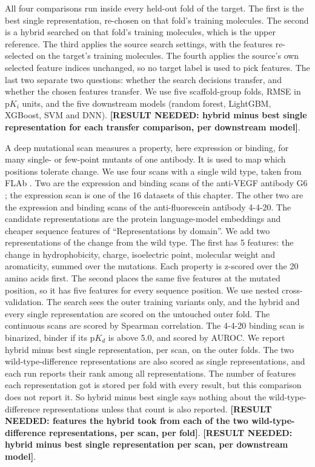 All four comparisons run inside every held-out fold of the target. The first is the best single representation, re-chosen on that fold's training molecules. The second is a hybrid searched on that fold's training molecules, which is the upper reference. The third applies the source search settings, with the features re-selected on the target's training molecules. The fourth applies the source's own selected feature indices unchanged, so no target label is used to pick features. The last two separate two questions: whether the search decisions transfer, and whether the chosen features transfer. We use five scaffold-group folds, RMSE in $\mathrm{p}K_i$ units, and the five downstream models (random forest, LightGBM, XGBoost, SVM and DNN). \textbf{[RESULT NEEDED: hybrid minus best single representation for each transfer comparison, per downstream model]}.

A deep mutational scan measures a property, here expression or binding, for many single- or few-point mutants of one antibody. It is used to map which positions tolerate change. We use four scans with a single wild type, taken from FLAb \citep{Chungyoun2024}. Two are the expression and binding scans of the anti-VEGF antibody G6 \citep{Koenig2017}; the expression scan is one of the 16 datasets of this chapter. The other two are the expression and binding scans of the anti-fluorescein antibody 4-4-20. The candidate representations are the protein language-model embeddings and cheaper sequence features of ``Representations by domain''. We add two representations of the change from the wild type. The first has 5 features: the change in hydrophobicity, charge, isoelectric point, molecular weight and aromaticity, summed over the mutations. Each property is z-scored over the 20 amino acids first. The second places the same five features at the mutated position, so it has five features for every sequence position. We use nested cross-validation. The search sees the outer training variants only, and the hybrid and every single representation are scored on the untouched outer fold. The continuous scans are scored by Spearman correlation. The 4-4-20 binding scan is binarized, binder if its $\mathrm{p}K_d$ is above 5.0, and scored by AUROC. We report hybrid minus best single representation, per scan, on the outer folds. The two wild-type-difference representations are also scored as single representations, and each run reports their rank among all representations. The number of features each representation got is stored per fold with every result, but this comparison does not report it. So hybrid minus best single says nothing about the wild-type-difference representations unless that count is also reported. \textbf{[RESULT NEEDED: features the hybrid took from each of the two wild-type-difference representations, per scan, per fold]}. \textbf{[RESULT NEEDED: hybrid minus best single representation per scan, per downstream model]}.

